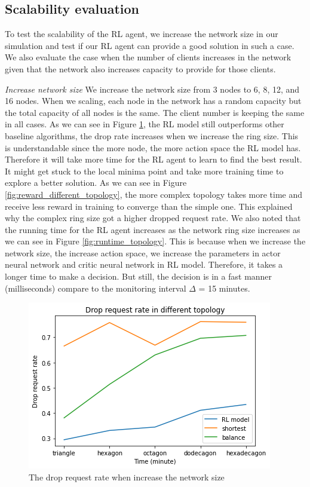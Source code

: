 \documentclass[conference]{IEEEtran}
\begin{document}
\subsection{Scalability evaluation}
To test the scalability of the RL agent, we increase the network size in our simulation and test if our RL agent can provide a good solution in such a case. We also evaluate the case when the number of clients increases in the network given that the network also increases capacity to provide for those clients.

\textit{Increase network size}
We increase the network size from 3 nodes to 6, 8, 12, and 16 nodes. When we scaling, each node in the network has a random capacity but the total capacity of all nodes is the same. The client number is keeping the same in all cases. As we can see in Figure \ref{fig:drop_request_rate_diff_topology}, the RL model still outperforms other baseline algorithms, the drop rate increases when we increase the ring size. This is understandable since the more node, the more action space the RL model has. Therefore it will take more time for the RL agent to learn to find the best result. It might get stuck to the local minima point and take more training time to explore a better solution. As we can see in Figure \ref{fig:reward_different_topology}, the more complex topology takes more time and receive less reward in training to converge than the simple one. This explained why the complex ring size got a higher dropped request rate. We also noted that the running time for the RL agent increases as the network ring size increases as we can see in Figure \ref{fig:runtime_topology}. This is because when we increase the network size, the increase action space, we increase the parameters in actor neural network and critic neural network in RL model. Therefore, it takes a longer time to make a decision. But still, the decision is in a fast manner (milliseconds) compare to the monitoring interval $\Delta$ = 15 minutes.

\begin{figure}[]
    \centering
    \includegraphics[scale = 0.5]{imgs/drop_request_rate_diff_topology.png}
    \caption{The drop request rate when increase the network size}
    \label{fig:drop_request_rate_diff_topology}
\end{figure}
\end{document}
